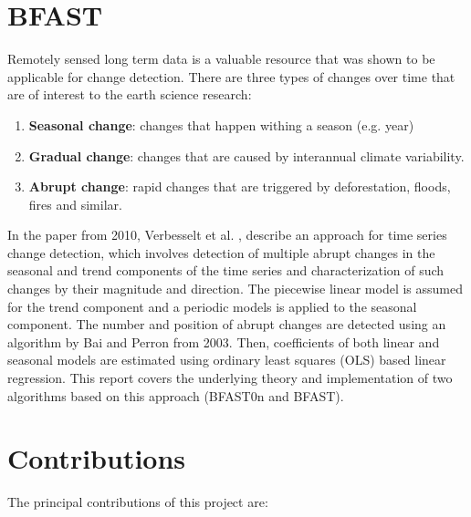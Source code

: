 \documentclass[main.tex]{subfiles}
\begin{document}
\section{BFAST}
\label{sec:changes}
Remotely sensed long term data is a valuable resource that was shown to be applicable for
change detection. There are three types of changes over time that are of
interest to the earth science research:
\begin{enumerate}
\item \textbf{Seasonal change}: changes that happen withing a season (e.g. year)
\item \textbf{Gradual change}: changes that are caused by interannual climate
  variability.
\item \textbf{Abrupt change}: rapid changes that are triggered by deforestation,
  floods, fires and similar.
\end{enumerate}
\medskip
In the paper from 2010, Verbesselt et al. \cite{bfast}, describe an approach for
time series change detection, which involves detection of multiple abrupt
changes in the seasonal and trend components of the time series and
characterization of such changes by their magnitude and direction. The piecewise
linear model is assumed for the trend component and a periodic models is applied
to the seasonal component. The number and position of abrupt changes are
detected using an algorithm by Bai and Perron from 2003\cite{bai_perron}. Then,
coefficients of both linear and seasonal models are estimated using ordinary
least squares (OLS) based linear regression. This report covers the underlying
theory and implementation of two algorithms based on this approach (BFAST0n and
BFAST).

\section{Contributions}
\label{sec:contributions}
The principal contributions of this project are: 
\end{document}
